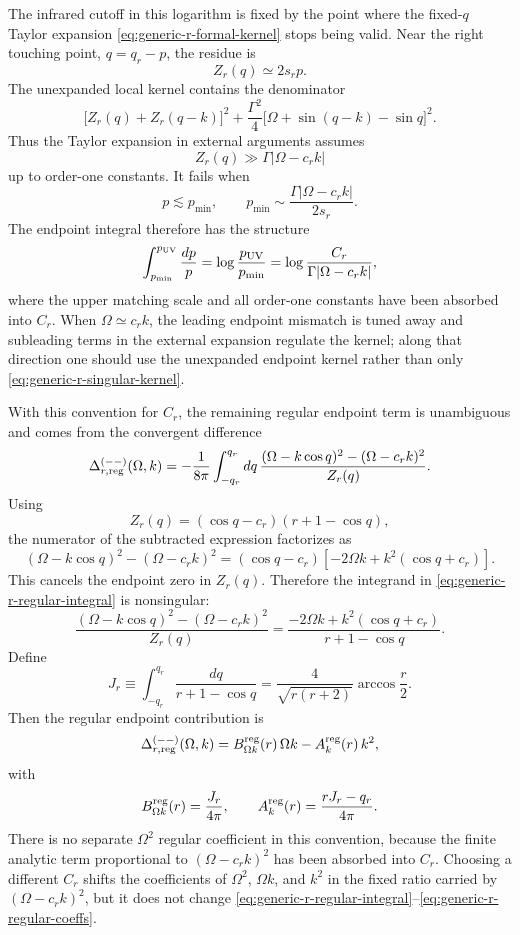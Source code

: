 \documentclass[aps,prx,preprint,amsmath,amssymb]{revtex4-2}
\begin{document}
The infrared cutoff in this logarithm is fixed by the point where the
fixed-\(q\) Taylor expansion \eqref{eq:generic-r-formal-kernel} stops being
valid.  Near the right touching point, \(q=q_r-p\), the residue is
\[
Z_r(q)\simeq 2s_r p.
\]
The unexpanded local kernel contains the denominator
\[
\bigl[Z_r(q)+Z_r(q-k)\bigr]^2
+\frac{\Gamma^2}{4}
\bigl[\Omega+\sin(q-k)-\sin q\bigr]^2.
\]
Thus the Taylor expansion in external arguments assumes
\[
Z_r(q)\gg \Gamma|\Omega-c_r k|
\]
up to order-one constants.  It fails when
\[
p\lesssim p_{\min},
\qquad
p_{\min}\sim \frac{\Gamma|\Omega-c_r k|}{2s_r}.
\]
The endpoint integral therefore has the structure
\[
\int_{p_{\min}}^{p_{\rm UV}}\frac{dp}{p}
=
\log\frac{p_{\rm UV}}{p_{\min}}
=
\log\frac{C_r}{\Gamma|\Omega-c_r k|},
\]
where the upper matching scale and all order-one constants have been absorbed
into \(C_r\).  When \(\Omega\simeq c_r k\), the leading endpoint mismatch is
tuned away and subleading terms in the external expansion regulate the kernel;
along that direction one should use the unexpanded endpoint kernel rather than
only \eqref{eq:generic-r-singular-kernel}.

With this convention for \(C_r\), the remaining regular endpoint term is
unambiguous and comes from the convergent difference
\begin{equation}
\label{eq:generic-r-regular-integral}
\Delta_{r,\rm reg}^{(--)}(\Omega,k)
=
-\frac{1}{8\pi}
\int_{-q_r}^{q_r}dq\,
\frac{(\Omega-k\cos q)^2-(\Omega-c_r k)^2}{Z_r(q)}.
\end{equation}
Using
\[
Z_r(q)=(\cos q-c_r)(r+1-\cos q),
\]
the numerator of the subtracted expression factorizes as
\[
(\Omega-k\cos q)^2-(\Omega-c_r k)^2
=
(\cos q-c_r)\left[-2\Omega k+k^2(\cos q+c_r)\right].
\]
This cancels the endpoint zero in \(Z_r(q)\).  Therefore the integrand in
\eqref{eq:generic-r-regular-integral} is nonsingular:
\begin{equation}
\frac{(\Omega-k\cos q)^2-(\Omega-c_r k)^2}{Z_r(q)}
=
\frac{-2\Omega k+k^2(\cos q+c_r)}{r+1-\cos q}.
\end{equation}
Define
\begin{equation}
\label{eq:Jr-def}
J_r
\equiv
\int_{-q_r}^{q_r}\frac{dq}{r+1-\cos q}
=
\frac{4}{\sqrt{r(r+2)}}\arccos\frac{r}{2}.
\end{equation}
Then the regular endpoint contribution is
\begin{equation}
\label{eq:generic-r-regular-final}
\Delta_{r,\rm reg}^{(--)}(\Omega,k)
=
B_{\Omega k}^{\rm reg}(r)\,\Omega k
-A_k^{\rm reg}(r)\,k^2,
\end{equation}
with
\begin{equation}
\label{eq:generic-r-regular-coeffs}
B_{\Omega k}^{\rm reg}(r)=\frac{J_r}{4\pi},
\qquad
A_k^{\rm reg}(r)=\frac{rJ_r-q_r}{4\pi}.
\end{equation}
There is no separate \(\Omega^2\) regular coefficient in this convention,
because the finite analytic term proportional to \((\Omega-c_r k)^2\) has been
absorbed into \(C_r\).  Choosing a different \(C_r\) shifts the coefficients of
\(\Omega^2\), \(\Omega k\), and \(k^2\) in the fixed ratio carried by
\((\Omega-c_r k)^2\), but it does not change
\eqref{eq:generic-r-regular-integral}--\eqref{eq:generic-r-regular-coeffs}.
\end{document}
